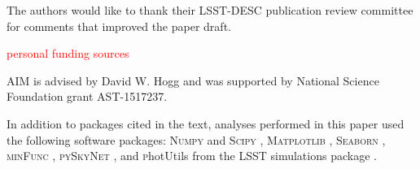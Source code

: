 \documentclass[\docopts]{\docclass}
\newcommand{\red}[1]{\textcolor{red}{#1}}
\begin{document}

The authors would like to thank their LSST-DESC publication review committee for comments that improved the paper draft.

{ \red{personal funding sources}}

AIM is advised by David W. Hogg and was supported by National Science Foundation grant AST-1517237.

In addition to packages cited in the text, analyses performed in this paper used the following software packages: \textsc{Numpy} and \textsc{Scipy} \citep{numpyscipy}, \textsc{Matplotlib} \citep{matplotlib}, \textsc{Seaborn} \citep{seaborn}, \textsc{minFunc} \citep{minfunc}, \textsc{pySkyNet} \citep{pyskynet}, and {\textsc photUtils} from the LSST simulations package \citep{lsstphotutils}.



%
%






\end{document}
